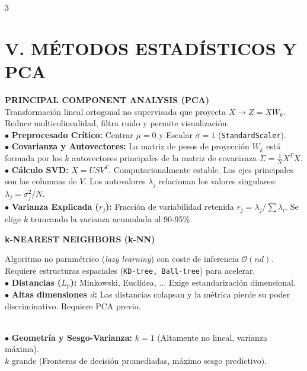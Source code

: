 \documentclass[8pt,a4paper,landscape,fleqn]{extarticle}
\begin{document}
\begin{multicols*}{3}
\section{V. MÉTODOS ESTADÍSTICOS Y PCA}

\textbf{PRINCIPAL COMPONENT ANALYSIS (PCA)}\\
Transformación lineal ortogonal no supervisada que proyecta $X \to Z = X W_k$. Reduce multicolinealidad, filtra ruido y permite visualización.\\
$\bullet$ \textbf{Preprocesado Crítico:} Centrar $\mu=0$ y Escalar $\sigma=1$ (\texttt{StandardScaler}).\\
$\bullet$ \textbf{Covarianza y Autovectores:} La matriz de pesos de proyección $W_k$ está formada por los $k$ autovectores principales de la matriz de covarianza $\Sigma = \frac{1}{N} X^T X$.\\
$\bullet$ \textbf{Cálculo SVD:} $X = U S V^T$. Computacionalmente estable. Los ejes principales son las columnas de $V$. Los autovalores $\lambda_j$ relacionan los valores singulares: $\lambda_j = \sigma_j^2 / N$.\\
$\bullet$ \textbf{Varianza Explicada ($r_j$):} Fracción de variabilidad retenida $r_j = \lambda_j / \sum \lambda_i$. Se elige $k$ truncando la varianza acumulada al 90-95\%.

\textbf{k-NEAREST NEIGHBORS (k-NN)}\\
\begin{minipage}{0.9\columnwidth}
Algoritmo no paramétrico (\textit{lazy learning}) con coste de inferencia $\mathcal{O}(nd)$. Requiere estructuras espaciales (\texttt{KD-tree, Ball-tree}) para acelerar.\\
$\bullet$ \textbf{Distancias ($L_p$):} Minkowski, Euclídea, $\dots$ Exige estandarización dimensional.\\
$\bullet$ \textbf{Altas dimensiones $d$:} Las distancias colapsan y la métrica pierde su poder discriminativo. Requiere PCA previo.
\end{minipage}
\begin{minipage}{0.09\columnwidth}
\hspace{4pt} \vspace{4pt}
\end{minipage}%
\\
$\bullet$ \textbf{Geometría y Sesgo-Varianza:}
$k=1$ (Altamente no lineal, varianza máxima).\\
$k$ grande (Fronteras de decisión promediadas, máximo sesgo predictivo).


\end{multicols*}
\end{document}
